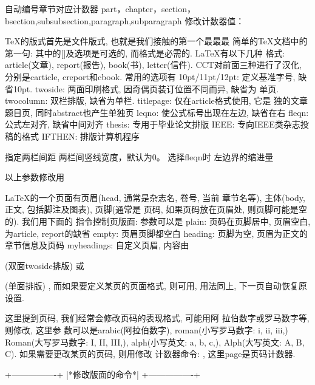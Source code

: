 \begin{center}
自动编号章节对应计数器 
part，chapter，section，bsection,subsubsection,paragraph,subparagraph 
修改计数器值： 
\setcounter{计数器名}{数} 
 
 TeX的版式首先是文件版式, 也就是我们接触的第一个最最最 
简单的TeX文档中的第一句: 
其中的[]及选项是可选的, 而{格式}是必需的. LaTeX有以下几种 
格式: article(文章), report(报告), book(书), letter(信件). 
CCT对前面三种进行了汉化, 分别是carticle, creport和cbook. 
常用的选项有 
  10pt/11pt/12pt: 定义基准字号, 缺省10pt. 
  twoside: 两面印刷格式, 因奇偶页装订位置不同而异, 缺省为 
           单页. 
  twocolumn: 双栏排版, 缺省为单栏. 
  titlepage: 仅在article格式使用, 它是 
             独的文章题目页, 同时abstract也产生单独页 
  leqno: 使公式标号出现在左边, 缺省在右 
  fleqn: 公式左对齐, 缺省中间对齐 
  thesis: 专用于毕业论文排版 
  IEEE: 专向IEEE类杂志投稿的格式 
  IFTHEN: 排版计算机程序 
  
\columnsep 指定两栏间距 
\columnseprule 两栏间竖线宽度，默认为0。 
\mathindent 选择fleqn时 左边界的缩进量 
 
以上参数修改用\setlength{\mathindent}{2.5cm} 
 
 
    LaTeX的一个页面有页眉(head, 通常是杂志名, 卷号, 当前 
章节名等), 主体(body, 正文, 包括脚注及图表), 页脚(通常是 
页码, 如果页码放在页眉处, 则页脚可能是空的). 我们用下面的 
指令控制页版面: 
        \pagestyle{参数} 
参数可以是 
  plain: 页码在页脚居中, 页眉空白, 为article, report的缺省 
  empty: 页眉页脚都空白 
  heading: 页脚为空, 页眉为正文的章节信息及页码 
  myheadings: 自定义页眉, 内容由 
        (双面twoside排版) 
   或             (单面排版) 
    , 而如果要定义某页的页面格式, 
则可用\thispagestyle, 用法同上, 下一页自动恢复原设置. 
  
    这里提到页码, 我们经常会修改页码的表现格式, 可能用阿 
拉伯数字或罗马数字等, 则修改, 这里参 
数可以是arabic(阿拉伯数字), roman(小写罗马数字: i, ii, iii,) 
Roman(大写罗马数字: I, II, III,), alph(小写英文: a, b, c,), 
Alph(大写英文: A, B, C). 如果需要更改某页的页码, 则用修改 
计数器命令: \setcounter{page}{数字}, 这里page是页码计数器. 
 
+----------------+ 
|*修改版面的命令*| 
+----------------+ 
 

\end{center}
